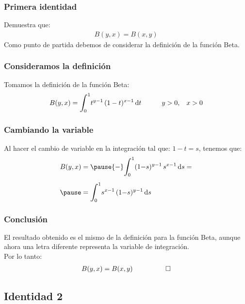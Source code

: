 \documentclass[12pt]{beamer}
\begin{document}
\begin{frame}
\frametitle{Primera identidad}
Demuestra que:
\pause
\begin{align*}
B(y, x) = B(x, y)
\end{align*}
\pause
Como punto de partida debemos de considerar la definición de la función Beta.
\end{frame}
\begin{frame}
\frametitle{Consideramos la definición}
Tomamos la definición de la función Beta:
\begin{align*}
B(y, x) = \scaleint{6ex}_{\bs 0}^{1} t^{y-1} \, (1 - t)^{x-1} \dd{t} \hspace{1cm} y > 0, \hspace{0.3cm} x > 0
\end{align*}
\end{frame}
\begin{frame}
\frametitle{Cambiando la variable}
Al hacer el cambio de variable en la integración tal que: $1 - t = s$, tenemos que:
\pause
\begin{eqnarray*}
\begin{aligned}
B(y, x) &= \pause {-} \scaleint{6ex}_{\bs 0}^{1} (1 {-} s)^{y-1} \, s^{x-1} \dd{s} = \\[0.5em] \pause
&= \scaleint{6ex}_{\bs 0}^{1} s^{x-1} \, (1 {-} s)^{y-1} \dd{s}
\end{aligned}
\end{eqnarray*}  
\end{frame}
\begin{frame}
\frametitle{Conclusión}
El resultado obtenido es el mismo de la definición para la función Beta, aunque ahora una letra diferente representa la variable de integración. 
\\
\bigskip
\pause
Por lo tanto:
\begin{align*}
B(y, x) = B(x, y) \hspace{1cm} \qed
\end{align*}
\end{frame}

\subsection{Identidad 2}
\end{document}
